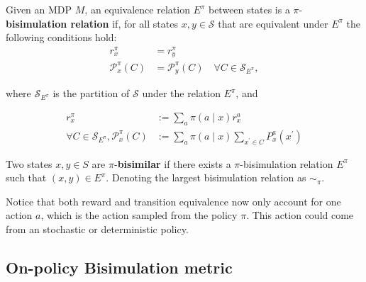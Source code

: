 \begin{definition}
\label{def:on-policy-bisimulation}
Given an MDP $M$, an equivalence relation $E^\pi$ between states is a $\pi$-\textbf{bisimulation relation} if, for all states $x, y \in \mathcal{S}$ that are equivalent under $E^\pi$ the following conditions hold:
\begin{align}
\label{eq:on_policy_reward_equivalence}
r_{x}^\pi & = r_{y}^\pi
 \\
\label{eq:on_policy_transition_equivalence}
\mathcal{P}_{x}^\pi\left(C \right) & =\mathcal{P}_{y}^\pi\left(C\right) \quad \forall C \in \mathcal{S}_{E^\pi},
\end{align}

where $\mathcal{S}_{E^\pi}$ is the partition of $\mathcal{S}$ under the relation $E^\pi$, and

\begin{equation}
\begin{aligned}
\label{eq:on_policy_reward_transition}
r_x^\pi & :=\sum_a \pi(a \mid x) r_x^a \\
\forall C \in \mathcal{S}_{E^\pi}, \mathcal{P}_x^\pi(C) & :=\sum_a \pi(a \mid x) \sum_{x^{\prime} \in C} P_x^a(x^{\prime})
\end{aligned}
\end{equation}

Two states $x, y \in S$ are $\pi$-\textbf{bisimilar} if there exists a $\pi$-bisimulation relation $E^\pi$ such that $(x, y) \in E^\pi$. Denoting the largest bisimulation relation as $\sim_\pi$.
\end{definition}

Notice that both reward and transition equivalence now only account for one action $a$, which is the action sampled from the policy $\pi$. This action could come from an stochastic or deterministic policy. 


\subsection{On-policy Bisimulation metric}


